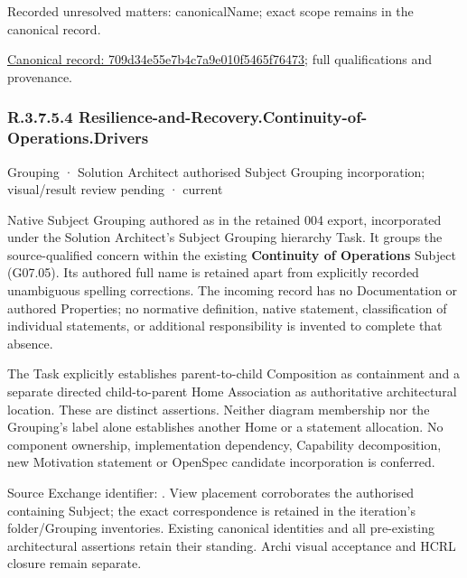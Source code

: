 {\small Recorded unresolved matters: canonicalName; exact scope remains in the canonical record.}\par
{\footnotesize \href{../../../../continuum/grouping/709d34e55e7b4c7a9e010f5465f76473.md}{Canonical record: 709d34e55e7b4c7a9e010f5465f76473}; full qualifications and provenance.}\par
\subsubsection*{R.3.7.5.4 Resilience-and-Recovery.Continuity-of-Operations.Drivers}
\label{navigation:R.3.7.5.4}

\label{element:f812d4f33612403986c174602b358a2f}
{\small Grouping · Solution Architect authorised Subject Grouping incorporation; visual/result review pending · current}\par

Native Subject Grouping authored as \texttt{} in the retained 004 export,
incorporated under the Solution Architect's Subject Grouping hierarchy Task.
It groups the source-qualified \texttt{} concern within
the existing \textbf{Continuity of Operations} Subject (G07.05). Its authored full name
is retained apart from explicitly recorded unambiguous spelling corrections.
The incoming record has no Documentation or authored Properties; no normative
definition, native statement, classification of individual statements, or
additional responsibility is invented to complete that absence.



The Task explicitly establishes parent-to-child Composition as containment and
a separate directed child-to-parent Home Association as authoritative architectural
location. These are distinct assertions. Neither diagram membership nor the
Grouping's label alone establishes another Home or a statement allocation.
No component ownership, implementation dependency, Capability decomposition,
new Motivation statement or OpenSpec candidate incorporation is conferred.



Source Exchange identifier: \texttt{}. View placement corroborates
the authorised containing Subject; the exact correspondence is retained in the
iteration's folder/Grouping inventories. Existing canonical identities and all
pre-existing architectural assertions retain their standing. Archi visual
acceptance and HCRL closure remain separate.



